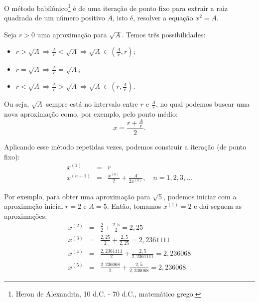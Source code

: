 \begin{ex}
O método babilônico\footnote{Heron de Alexandria, 10 d.C. - 70 d.C., matemático grego.} é de uma iteração de ponto fixo para extrair a raiz quadrada de um número positivo $A$, isto é, resolver a equação $x^2 = A$.

Seja $r>0$ uma aproximação para $\sqrt{A}$. Temos três possibilidades:
\begin{itemize}
\item $r>\sqrt{A} \Longrightarrow \frac{A}{r}<\sqrt{A} \Longrightarrow \sqrt{A}\in \left(\frac{A}{r}, r\right);$
\item $r=\sqrt{A} \Longrightarrow \frac{A}{r}=\sqrt{A};$
\item $r<\sqrt{A} \Longrightarrow \frac{A}{r}>\sqrt{A} \Longrightarrow \sqrt{A}\in \left(r, \frac{A}{r}\right).$
\end{itemize}
Ou seja, $\sqrt{A}$ sempre está no intervalo entre $r$ e $\frac{A}{r}$, no qual podemos buscar uma nova aproximação como, por exemplo, pelo ponto médio:
$$x=\frac{r+\frac{A}{r}}{2}.$$

Aplicando esse método repetidas vezes, podemos construir a iteração (de ponto fixo):
\begin{eqnarray*}
x^{(1)}&=&r \\
x^{(n+1)}&=&\frac{x^{(n)}}{2}+\frac{A}{2x^{(n)}}, \quad n=1,2,3,...
\end{eqnarray*}

Por exemplo, para obter uma aproximação para $\sqrt{5}$, podemos iniciar com a aproximação inicial $r=2$ e $A=5$. Então, tomamos $x^{(1)} = 2$ e daí seguem as aproximações:
\begin{eqnarray*}
x^{(2)}&=&\frac{2}{2}+\frac{2,5}{2} = 2,25\\
x^{(3)}&=&\frac{2,25}{2}+\frac{2,5}{2,25}= 2,2361111  \\
x^{(4)}&=&\frac{2,2361111}{2}+\frac{2,5}{2,2361111}= 2,236068  \\
x^{(5)}&=&\frac{2,236068}{2}+\frac{2,5}{2,236068}= 2,236068
\end{eqnarray*}
\end{ex}  


